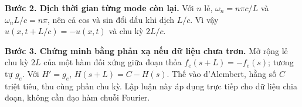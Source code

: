 \documentclass[10pt,a4paper]{article}
\begin{document}
\textbf{Bước 2. Dịch thời gian từng mode còn lại.} Với $n$ lẻ, $\omega_n=n\pi c/L$ và $\omega_nL/c=n\pi$, nên cả cos và sin đổi dấu khi dịch $L/c$. Vì vậy $u(x,t+L/c)=-u(x,t)$ và chu kỳ $2L/c$.

\textbf{Bước 3. Chứng minh bằng phản xạ nếu dữ liệu chưa trơn.} Mở rộng lẻ chu kỳ $2L$ của một hàm đối xứng giữa đoạn thỏa $f_e(s+L)=-f_e(s)$; tương tự $g_e$. Với $H'=g_e$, $H(s+L)=C-H(s)$. Thế vào d'Alembert, hằng số $C$ triệt tiêu, thu cùng phản chu kỳ. Lập luận này áp dụng trực tiếp cho dữ liệu chia đoạn, không cần đạo hàm chuỗi Fourier.
\end{document}

